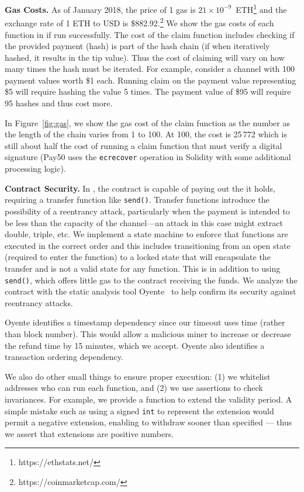 \textbf{Gas Costs.} As of January 2018, the price of 1 gas is $21\times10^{-9}$~ETH\footnote{https://ethstats.net/} and the exchange rate of 1 ETH to USD is \$882.92.\footnote{https://coinmarketcap.com/} We show the gas costs of each function in \ew if run successfully. The cost of the claim function includes checking if the provided payment (hash) is part of the hash chain (if when iteratively hashed, it results in the tip value). Thus the cost of claiming will vary on how many times the hash must be iterated. For example, consider a channel with 100 payment values worth \$1 each. Running claim on the payment value representing \$5 will require hashing the value 5 times. The payment value of \$95 will require 95 hashes and thus cost more. 

In Figure~\ref{fig:gas}, we show the gas cost of the claim function as the number as the length of the chain varies from 1 to 100. At 100, the cost is 25\,772 which is still about half the cost of running a claim function that must verify a digital signature (\eg \textsf{Pay50} uses the \texttt{ecrecover} operation in Solidity with some additional processing logic).

\textbf{Contract Security.} In \ew, the contract is capable of paying out the \eth it holds, requiring a transfer function like \texttt{send()}. Transfer functions introduce the possibility of a reentrancy attack, particularly when the payment is intended to be less than the capacity of the channel---\eg an attack in this case might extract double, triple, etc. We implement a state machine to enforce that functions are executed in the correct order and this includes transitioning from an open state (required to enter the function) to a locked state that will encapsulate the transfer and is not a valid state for any function. This is in addition to using \texttt{send()}, which offers little gas to the contract receiving the funds. We analyze the contract with the static analysis tool Oyente~\cite{LCOSH16} to help confirm its security against reentrancy attacks. 

Oyente identifies a timestamp dependency since our timeout uses time (rather than block number). This would allow a malicious miner to increase or decrease the refund time by 15 minutes, which we accept. Oyente also identifies a transaction ordering dependency. 

We also do other small things to ensure proper execution: (1) we whitelist addresses who can run each function, and (2) we use assertions to check invariances. For example, we provide a function to extend the validity period. A simple mistake such as using a signed \texttt{int} to represent the extension would permit a negative extension, enabling \make to withdraw sooner than specified --- thus we assert that extensions are positive numbers.

